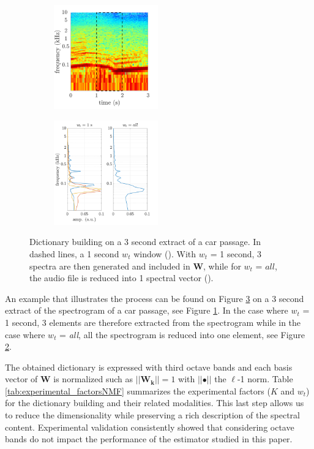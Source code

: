 \documentclass[twocolumn,a4paper,10pt]{article}
\begin{document}
\begin{figure}[t!]
    \centering
    \begin{subfigure}[t]{0.47\linewidth}
        \centering
       \includegraphics[height=4.5cm]{figures/dictionary3.pdf}
       \caption{}
        \label{fig:specW}
    \end{subfigure}%
    \hfill
    \begin{subfigure}[t]{0.47\linewidth}
        \centering
       \includegraphics[height=4.5cm]{figures/dictionary4.pdf}
        \caption{}
        \label{fig:ElementW}
    \end{subfigure}
    \caption{Dictionary building on a 3 second extract of a car passage. In dashed lines, a 1 second $w_t$ window  (). With $w_t$ = 1 second, 3 spectra are then generated and included in $\mathbf{W}$, while for $w_t$ = $all$, the audio file is reduced into 1 spectral vector ().}
    \label{fig:spec_elementW}
\end{figure}


An example that illustrates the process can be found on Figure \ref{fig:spec_elementW} on a 3 second extract of the spectrogram of a car passage, see Figure \ref{fig:specW}. In the case where $w_t$ = 1 second, 3 elements are therefore extracted from the spectrogram while in the case where $w_t$ = \textit{all}, all the spectrogram is reduced into one element, see Figure \ref{fig:ElementW}.

The obtained dictionary is expressed with third octave bands and each basis vector of $\mathbf{W}$ is normalized such as $\vert \vert \mathbf{W_k} \vert \vert = 1$ with $\vert \vert \bullet \vert\vert$ the $\ell$-1 norm. Table \ref{tab:experimental_factorsNMF} summarizes the experimental factors ($K$ and $w_t$) for the dictionary building and their related modalities. This last step allows us to reduce the dimensionality while preserving a rich description of the spectral content. Experimental validation consistently showed that considering octave bands do not impact the performance of the estimator studied in this paper.
\end{document}
